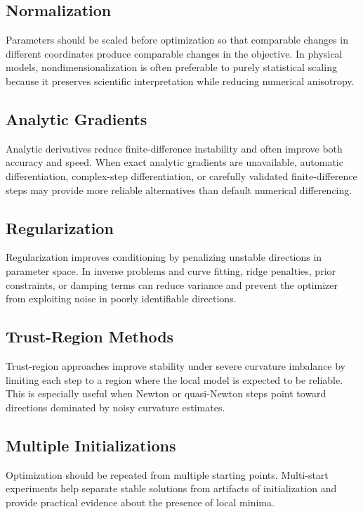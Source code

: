 \subsection{Normalization}

Parameters should be scaled before optimization so that comparable changes in different coordinates produce comparable changes in the objective. In physical models, nondimensionalization is often preferable to purely statistical scaling because it preserves scientific interpretation while reducing numerical anisotropy.

\subsection{Analytic Gradients}

Analytic derivatives reduce finite-difference instability and often improve both accuracy and speed. When exact analytic gradients are unavailable, automatic differentiation, complex-step differentiation, or carefully validated finite-difference steps may provide more reliable alternatives than default numerical differencing.

\subsection{Regularization}

Regularization improves conditioning by penalizing unstable directions in parameter space. In inverse problems and curve fitting, ridge penalties, prior constraints, or damping terms can reduce variance and prevent the optimizer from exploiting noise in poorly identifiable directions.

\subsection{Trust-Region Methods}

Trust-region approaches improve stability under severe curvature imbalance by limiting each step to a region where the local model is expected to be reliable. This is especially useful when Newton or quasi-Newton steps point toward directions dominated by noisy curvature estimates.

\subsection{Multiple Initializations}

Optimization should be repeated from multiple starting points. Multi-start experiments help separate stable solutions from artifacts of initialization and provide practical evidence about the presence of local minima.


